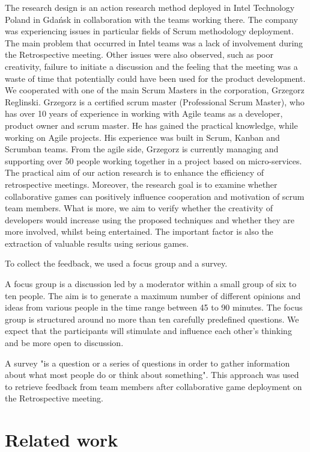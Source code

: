 The research design is an action research method deployed in Intel Technology Poland in Gdańsk in collaboration with the teams working there. The company was experiencing issues in particular fields of Scrum methodology deployment. The main problem that occurred in Intel teams was a lack of involvement during the Retrospective meeting. Other issues were also observed, such as poor creativity, failure to initiate a discussion and the feeling that the meeting was a waste of time that potentially could have been used for the product development. We cooperated with one of the main Scrum Masters in the corporation, Grzegorz Reglinski. Grzegorz is a certified scrum master (Professional Scrum Master), who has over 10 years of experience in working with Agile teams as a developer, product owner and scrum master. He has gained the practical knowledge, while working on Agile projects. His experience was built in Scrum, Kanban and Scrumban teams. From the agile side, Grzegorz is currently managing and supporting over 50 people working together in a project based on micro-services. The practical aim of our action research is to enhance the efficiency of retrospective meetings. Moreover, the research goal is to examine whether collaborative games can positively influence cooperation and motivation of scrum team members. What is more, we aim to verify whether the creativity of developers would increase using the proposed techniques and whether they are more involved, whilst being entertained. The important factor is also the extraction of valuable results using serious games.

To collect the feedback, we used a focus group and a survey.

A focus group is a discussion led by a moderator within a small group of six to ten people. The aim is to generate a maximum number of different opinions and ideas from various people in the time range between 45 to 90 minutes. The focus group is structured around no more than ten carefully predefined questions. We expect that the participants will stimulate and influence each other's thinking and be more open to discussion\cite{FocusGroupBib}.

A survey "is a question or a series of questions in order to gather information about what most people do or think about something"\cite{Webster}. This approach was used to retrieve feedback from team members after collaborative game deployment on the Retrospective meeting.

\section{Related work}

